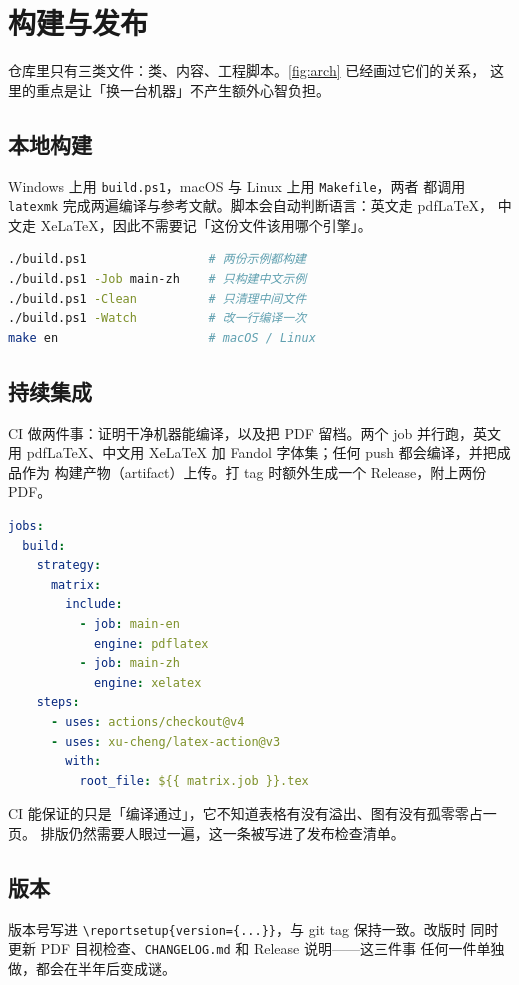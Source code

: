 \section{构建与发布}
\label{sec:build}

仓库里只有三类文件：类、内容、工程脚本。\cref{fig:arch} 已经画过它们的关系，
这里的重点是让「换一台机器」不产生额外心智负担。

\subsection{本地构建}

Windows 上用 \texttt{build.ps1}，macOS 与 Linux 上用 \texttt{Makefile}，两者
都调用 \texttt{latexmk} 完成两遍编译与参考文献。脚本会自动判断语言：英文走 pdfLaTeX，
中文走 XeLaTeX，因此不需要记「这份文件该用哪个引擎」。

\begin{lstlisting}[language=bash,
  caption={常用构建命令。给出 \texttt{-Job} 时只构建其中一份。},
  label={lst:build}]
./build.ps1                 # 两份示例都构建
./build.ps1 -Job main-zh    # 只构建中文示例
./build.ps1 -Clean          # 只清理中间文件
./build.ps1 -Watch          # 改一行编译一次
make en                     # macOS / Linux
\end{lstlisting}

\subsection{持续集成}

CI 做两件事：证明干净机器能编译，以及把 PDF 留档。两个 job 并行跑，英文用
pdfLaTeX、中文用 XeLaTeX 加 Fandol 字体集；任何 push 都会编译，并把成品作为
构建产物（artifact）上传。打 tag 时额外生成一个 Release，附上两份 PDF。

\begin{lstlisting}[language=yaml,
  caption={CI 的关键片段。中文任务通过 \texttt{\textbackslash PassOptionsToClass} 注入 \texttt{fandol} 字体集，避免依赖宿主系统字体。},
  label={lst:ci}]
jobs:
  build:
    strategy:
      matrix:
        include:
          - job: main-en
            engine: pdflatex
          - job: main-zh
            engine: xelatex
    steps:
      - uses: actions/checkout@v4
      - uses: xu-cheng/latex-action@v3
        with:
          root_file: ${{ matrix.job }}.tex
\end{lstlisting}

CI 能保证的只是「编译通过」，它不知道表格有没有溢出、图有没有孤零零占一页。
排版仍然需要人眼过一遍，这一条被写进了发布检查清单。

\subsection{版本}

版本号写进 \verb|\reportsetup{version={...}}|，与 git tag 保持一致。改版时
同时更新 PDF 目视检查、\texttt{CHANGELOG.md} 和 Release 说明——这三件事
任何一件单独做，都会在半年后变成谜。
